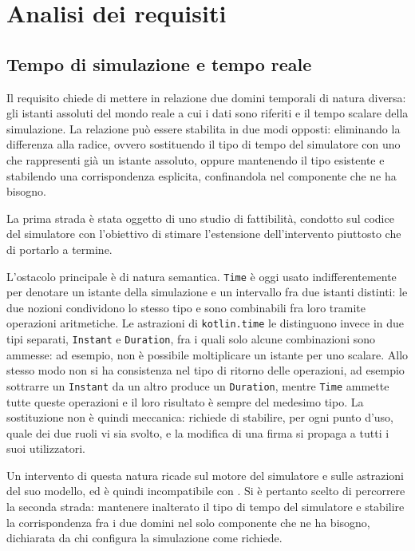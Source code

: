 \section{Analisi dei requisiti}
\label{sec:analisi-requisiti}

\subsection{Tempo di simulazione e tempo reale}
\label{subsec:corrispondenza-temporale}

Il requisito  chiede di mettere in relazione due domini temporali di natura
diversa: gli istanti assoluti del mondo reale a cui i dati sono riferiti e il tempo
scalare della simulazione. La relazione può essere stabilita in due modi opposti:
eliminando la differenza alla radice, ovvero sostituendo il tipo di tempo del simulatore
con uno che rappresenti già un istante assoluto, oppure mantenendo il tipo esistente e
stabilendo una corrispondenza esplicita, confinandola nel componente che ne ha bisogno.

La prima strada è stata oggetto di uno studio di fattibilità, condotto sul codice del
simulatore con l'obiettivo di stimare l'estensione dell'intervento piuttosto che di
portarlo a termine.

L'ostacolo principale è di natura semantica. \texttt{Time} è oggi usato
indifferentemente per denotare un istante della simulazione e un intervallo fra due
istanti distinti: le due nozioni condividono lo stesso tipo e sono combinabili fra loro
tramite operazioni aritmetiche. Le astrazioni di \texttt{kotlin.time} le distinguono
invece in due tipi separati, \texttt{Instant} e \texttt{Duration}, fra i quali solo alcune
combinazioni sono ammesse: ad esempio, non è possibile moltiplicare un istante per uno
scalare. Allo stesso modo non si ha consistenza nel tipo di ritorno delle operazioni,
ad esempio sottrarre un \texttt{Instant} da un altro produce un \texttt{Duration}, mentre
\texttt{Time} ammette tutte queste operazioni e il loro risultato è sempre del medesimo
tipo. La sostituzione non è quindi meccanica: richiede di stabilire, per ogni punto d'uso,
quale dei due ruoli vi sia svolto, e la modifica di una firma si propaga a tutti i suoi
utilizzatori.

Un intervento di questa natura ricade sul motore del simulatore e sulle astrazioni del suo
modello, ed è quindi incompatibile con . Si è pertanto scelto di percorrere la
seconda strada: mantenere inalterato il tipo di tempo del simulatore e stabilire la
corrispondenza fra i due domini nel solo componente che ne ha bisogno, dichiarata da chi
configura la simulazione come  richiede.

